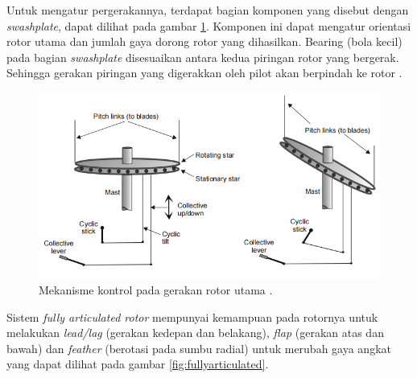 Untuk mengatur pergerakannya, terdapat bagian komponen yang disebut dengan \textit{swashplate}, dapat dilihat pada gambar \ref{fig:swashplate}. Komponen ini dapat mengatur orientasi rotor utama dan jumlah gaya dorong rotor yang dihasilkan. Bearing (bola kecil) pada bagian \textit{swashplate} disesuaikan antara kedua piringan rotor yang bergerak. Sehingga gerakan piringan yang digerakkan oleh pilot akan berpindah ke rotor \cite{wagtendonk2006principles}.

\begin{figure}[H]
	\centering
	\includegraphics[width=0.7\linewidth]{gambar/swashplate.png}
	\caption{Mekanisme kontrol pada gerakan rotor utama \cite{handbook}.}
	\label{fig:swashplate}
\end{figure}
Sistem \textit{fully articulated rotor} mempunyai kemampuan pada rotornya untuk melakukan \textit{lead/lag} (gerakan kedepan dan belakang), \textit{flap} (gerakan atas dan bawah) dan \textit{feather} (berotasi pada sumbu radial) untuk merubah gaya angkat \cite{handbook} yang dapat dilihat pada gambar \ref{fig:fullyarticulated}.


